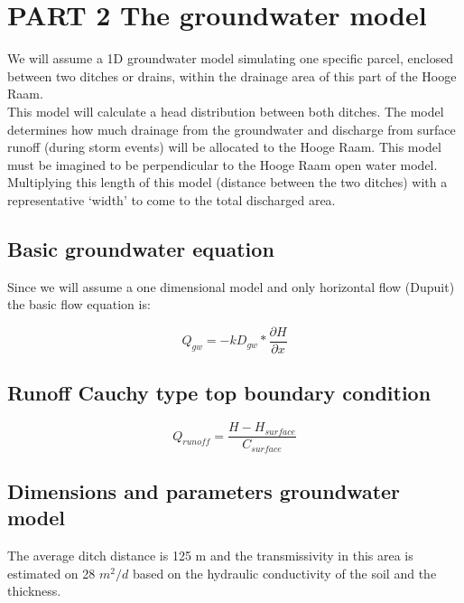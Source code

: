 \documentclass[
]{article}
\begin{document}
\hypertarget{part-2-the-groundwater-model}{%
\section{PART 2 The groundwater
model}\label{part-2-the-groundwater-model}}

We will assume a 1D groundwater model simulating one specific parcel,
enclosed between two ditches or drains, within the drainage area of this
part of the Hooge Raam.\\
This model will calculate a head distribution between both ditches. The
model determines how much drainage from the groundwater and discharge
from surface runoff (during storm events) will be allocated to the Hooge
Raam. This model must be imagined to be perpendicular to the Hooge Raam
open water model. Multiplying this length of this model (distance
between the two ditches) with a representative `width' to come to the
total discharged area.

\hypertarget{basic-groundwater-equation}{%
\subsection{Basic groundwater
equation}\label{basic-groundwater-equation}}

Since we will assume a one dimensional model and only horizontal flow
(Dupuit) the basic flow equation is:

\[
Q_{gw} = -kD_{gw} * \frac {\partial H}{\partial x}
\]

\hypertarget{runoff-cauchy-type-top-boundary-condition}{%
\subsection{Runoff Cauchy type top boundary
condition}\label{runoff-cauchy-type-top-boundary-condition}}

\[
Q_{runoff}= \frac{H - H_{surface}}{C_{surface}}
\]

\hypertarget{dimensions-and-parameters-groundwater-model}{%
\subsection{Dimensions and parameters groundwater
model}\label{dimensions-and-parameters-groundwater-model}}

The average ditch distance is 125 m and the transmissivity in this area
is estimated on 28 \(m^2/d\) based on the hydraulic conductivity of the
soil and the thickness.
\end{document}
